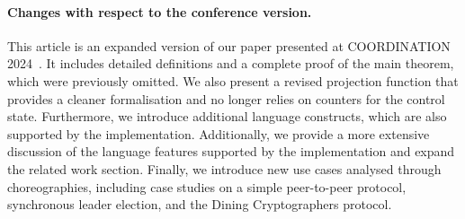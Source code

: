 \paragraph{Changes with respect to the conference version.}
%
This article is an expanded version of our paper presented at
COORDINATION 2024~\cite{CV24}. It includes detailed definitions and a
complete proof of the main theorem, which were previously omitted. We
also present a revised projection function that provides a cleaner
formalisation and no longer relies on counters for the control state.
Furthermore, we introduce additional language constructs, which are
also supported by the implementation. Additionally, we provide a more
extensive discussion of the language features supported by the
implementation and expand the related work section. Finally, we
introduce new use cases analysed through choreographies, including
case studies on a simple peer-to-peer protocol, synchronous leader
election, and the Dining Cryptographers protocol.

